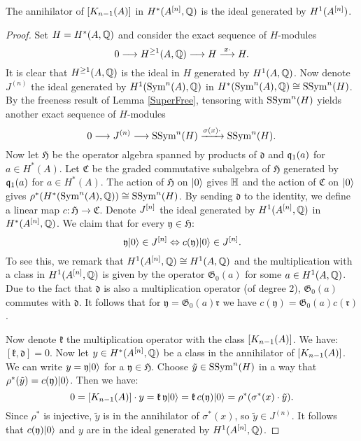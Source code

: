 \begin{proposition}
The annihilator of $[\kum{A}{n-1}]$ in $H^*(A\hilb{n},\Q)$ is the ideal generated by $H^1(A\hilb{n})$. 
\end{proposition}
\begin{proof}
Set $H=H^*(A,\Q)$ and consider the exact sequence of $H$-modules
$$
0 \longrightarrow H^{\geq 1}(A,\Q)  \longrightarrow H \stackrel{x\cdot}{\longrightarrow} H.
$$
It is clear that $H^{\geq 1}(A,\Q)$ is the ideal in $H$ generated by $H^{1}(A,\Q)$. 
Now denote $J^{(n)}$ the ideal generated by $H^1(\Sym^n(A),\Q)$ in $H^*(\Sym^n(A),\Q)\cong\SSym^n(H)$.
By the freeness result of Lemma \ref{SuperFree}, tensoring with $\SSym^n(H)$ yields another exact sequence of $H$-modules
$$
0 \longrightarrow {J}^{(n)} \longrightarrow \SSym^n(H) \xrightarrow{\sigma(x)\cdot} \SSym^n(H).
$$
Now let $\mathfrak{H}$ be the operator algebra spanned by products of $\mathfrak d$ and $\q_1(a)$ for $a\in H^*(A)$. Let $\mathfrak C$ be the graded commutative subalgebra of $\mathfrak H$ generated by $\q_1(a)$ for $a\in H^*(A)$. The action of $\mathfrak H$ on $\vac$ gives $\H$ and the action of $\mathfrak C$ on $\vac$ gives $\rho^*(H^*(\Sym^n(A),\Q))\cong \SSym^n(H)$.
By sending $\mathfrak d$ to the identity, we define a linear map $c : \mathfrak H \rightarrow \mathfrak C$. 
Denote $J\hilb{n}$ the ideal generated by $H^1(A\hilb{n},\Q)$ in $H^*(A \hilb n,\Q)$. We claim that for every $\mathfrak y\in \mathfrak H$:
$$
\mathfrak y\vac \in J\hilb{n} \Leftrightarrow c(\mathfrak y)\vac \in J\hilb{n}.
$$
To see this, we remark that $H^1(A \hilb n,\Q) \cong H^1(A ,\Q)  $ and the multiplication with a class in $H^1(A \hilb n,\Q) $ is given by the operator $\mathfrak G_0(a)$ for some $a\in H^1(A ,\Q)$. Due to the fact that $\mathfrak d$ is also a multiplication operator (of degree 2), $\mathfrak G_0(a)$ commutes with $\mathfrak d$. It follows that for $\mathfrak y =\mathfrak G_0(a) \mathfrak r$ we have $c(\mathfrak y) = \mathfrak G_0(a) c(\mathfrak r)$.

Now denote $\mathfrak k$ the multiplication operator with the class $[\kum{A}{n-1}]$. We have:
$
[\mathfrak k, \mathfrak d] = 0.
$
Now let $y\in H^*(A\hilb{n},\Q)$ be a class in the annihilator of $[\kum{A}{n-1}]$. We can write $y= \mathfrak y\vac$ for a $\mathfrak y\in\mathfrak H$. Choose $\tilde y \in \SSym^n (H)$ in a way that $\rho^*(\tilde y) = c(\mathfrak y) \vac$. Then we have:
$$
0=[\kum{A}{n-1}]\cdot y = \mathfrak k\, \mathfrak y \vac =  \mathfrak k \,c(\mathfrak y)\vac = \rho^*(\sigma^*(x) \cdot \tilde y).
$$
Since $\rho^*$ is injective, $\tilde y$ is in the annihilator of $\sigma^*(x)$, so $\tilde y \in J^{(n)}$. It follows that $c(\mathfrak y)\vac$ and $y$ are in the ideal generated by $H^1(A\hilb{n},\Q)$.
\end{proof}

